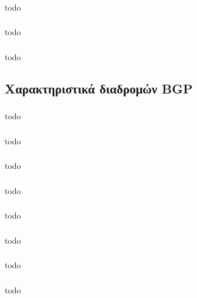 \documentclass[a4paper, 12pt]{article}
\begin{document}
		\subsubsection{}
			todo

		\subsubsection{}
			todo

		\subsubsection{}
			todo
		
	\subsection{Χαρακτηριστικά διαδρομών BGP}

		\subsubsection{}
			todo

		\subsubsection{}
			todo

		\subsubsection{}
			todo

		\subsubsection{}
			todo

		\subsubsection{}
			todo

		\subsubsection{}
			todo

		\subsubsection{}
			todo

		\subsubsection{}
			todo
\end{document}
